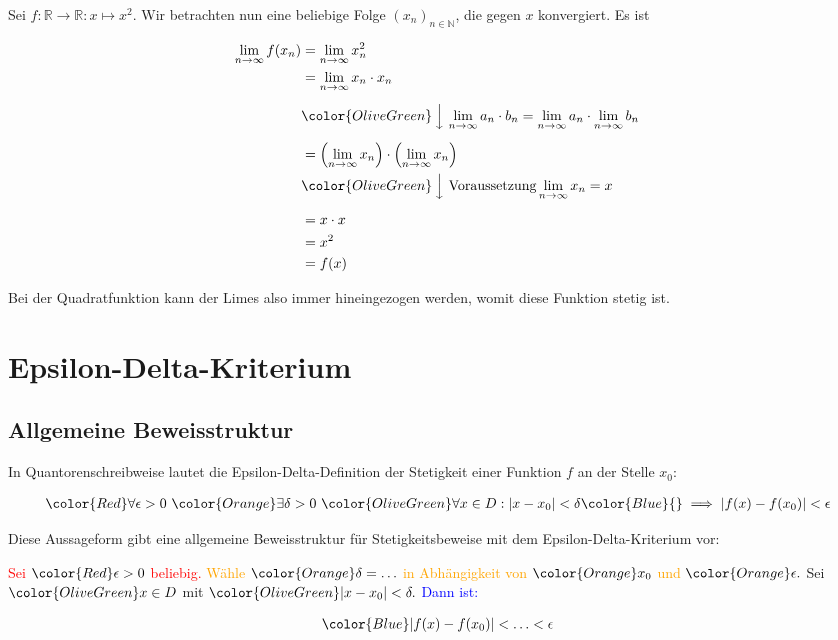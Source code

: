 \documentclass[fontsize=9pt,
               parskip=half-,
               DIV=14,
               listof=chapterentry,
               tocflat]{scrbook}
\begin{document}
\begin{proof*}
Sei $f:\mathbb {R} \to \mathbb {R} :x\mapsto x^{2}$. Wir betrachten nun eine beliebige Folge $(x_{n})_{n\in \mathbb {N} }$, die gegen $x$ konvergiert. Es ist

\begin{align*}
\lim _{n\to \infty }f(x_{n})&=\lim _{n\to \infty }x_{n}^{2}\\&=\lim _{n\to \infty }x_{n}\cdot x_{n}\\[0.5em]&{\color {OliveGreen}\left\downarrow \ \lim _{n\to \infty }a_{n}\cdot b_{n}=\lim _{n\to \infty }a_{n}\cdot \lim _{n\to \infty }b_{n}\right.}\\[0.5em]&=\left(\lim _{n\to \infty }x_{n}\right)\cdot \left(\lim _{n\to \infty }x_{n}\right)\\&{\color {OliveGreen}\left\downarrow \ {\text{Voraussetzung}}\lim _{n\to \infty }x_{n}=x\right.}\\[0.5em]&=x\cdot x\\&=x^{2}\\&=f(x)
\end{align*}

Bei der Quadratfunktion kann der Limes also immer hineingezogen werden, womit diese Funktion stetig ist.

\end{proof*}

\section{Epsilon-Delta-Kriterium}

\subsection{Allgemeine Beweisstruktur}

In Quantorenschreibweise lautet die Epsilon-Delta-Definition der Stetigkeit einer Funktion $f$ an der Stelle $x_{0}$:

\begin{align*}
{\color {Red}\forall \epsilon >0}\ {\color {Orange}\exists \delta >0}\ {\color {OliveGreen}\forall x\in D:|x-x_{0}|<\delta }{\color {Blue}{}\implies |f(x)-f(x_{0})|<\epsilon }
\end{align*}

Diese Aussageform gibt eine allgemeine Beweisstruktur für Stetigkeitsbeweise mit dem Epsilon-Delta-Kriterium vor:

\begin{importantparagraph*}
{\textcolor{Red}{Sei ${\color {Red}\epsilon >0}$ beliebig.}} {\textcolor{Orange}{Wähle ${\color {Orange}\delta =\ldots }$ in Abhängigkeit von ${\color {Orange}x_{0}}$ und ${\color {Orange}\epsilon .}$}} {\textcolor{OliveGreen}{Sei ${\color {OliveGreen}x\in D}$ mit ${\color {OliveGreen}|x-x_{0}|<\delta .}$}} {\textcolor{Blue}{Dann ist:}}

\begin{align*}
{\color {Blue}|f(x)-f(x_{0})|<\ldots <\epsilon }
\end{align*}

\end{importantparagraph*}
\end{document}
